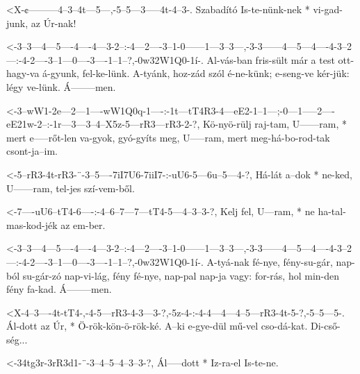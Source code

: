   {<X-¢---------4--3--4t---5---,-5--5---3-----4t-4--3-.}
  {   Szabadító Is-te-nünk-nek * vi-gad-junk, az Úr-nak!}


  {<-3--3---4---5----4----4---3-2--:-4---2----3--1-0------1---3--3---,-3-3------4---5---4----4-3--2---:-4-2----3--1---0----3----1--1--?,-0w32W1Q0-1í-.}
  {  Al-vás-ban fris-sült már a test ott-hagy-va á-gyunk, fel-ke-lünk. A-tyánk, hoz-zád szól é-ne-künk; e-seng-ve kér-jük: légy ve-lünk. Á--------men.}

  {<-3--wW1-2e---2---1----wW1Q0q-1----:-1t---tT4R3-4---eE2-1--1---;-0---1-----2----eE21w-2--:-1r---3---3--4--X5z-5---rR3---rR3-2-?,}
  {  Kö-nyö-rülj raj-tam, U------ram, * mert e-----rőt-len va-gyok, gyó-gyíts meg, U-----ram, mert meg-há-bo-rod-tak csont-ja--im.}

  {<-5--rR3-4t-rR3-¨-3--5----7iI7U6-7iiI7-:-uU6-5---6u--5---4-?,}
  {  Há-lát a--dok * ne-ked, U------ram,    tel-jes szí-vem-ből.}

  {<-7----uU6--tT4-6----:-4--6--7---7---tT4-5---4--3--3-?,}
  {  Kelj fel, U---ram, * ne ha-tal-mas-kod-jék az em-ber.}


  {<-3--3---4---5----4----4---3-2--:-4---2----3--1-0------1---3--3---,-3-3------4---5---4----4-3--2---:-4-2----3--1---0----3----1--1--?,-0w32W1Q0-1í-.}
  {  A-tyá-nak fé-nye, fény-su-gár, nap-ból su-gár-zó nap-vi-lág, fény fé-nye, nap-pal nap-ja vagy: for-rás, hol min-den fény fa-kad. Á--------men.}

  {<X-4--3----4t-tT4-,-4-5---rR3-4-3---3-?,-5z-4-:-4-4---4---4--5---rR3-4t-5-?,-5--5---5-.}
  {   Ál-dott az Úr, * Ö-rök-kön-ö-rök-ké.  A--ki  e-gye-dül mű-vel cso-dá-kat. Di-cső-ség...}

  {<-34tg3r-3rR3d1-¨-3--4--5--4--3--3-?,}
  {  Ál-----dott   * Iz-ra-el Is-te-ne.}

